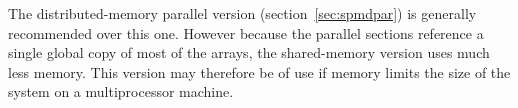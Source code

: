 \documentclass[twoside]{report}
\newcommand{\ie}{{\em i.e}.\ }
\begin{document}
The distributed-memory parallel version (section~\ref{sec:spmdpar}) is
generally recommended over this one.  However because the parallel
sections reference a single global copy of most of the arrays, the
shared-memory version uses much less memory.  This version may
therefore be of use if memory limits the size of the system on 
a multiprocessor machine.

% 
% 
% 
\end{document}
